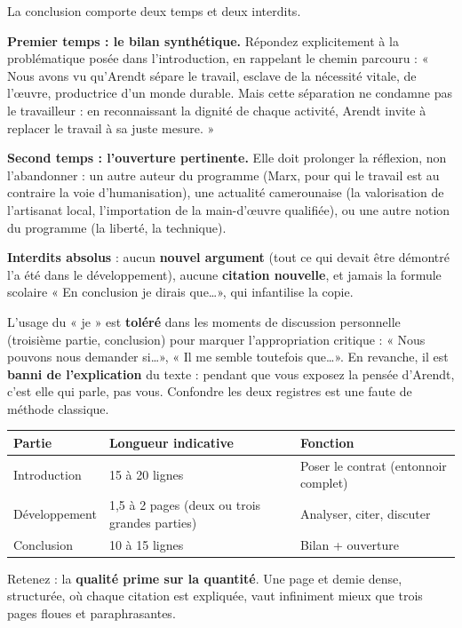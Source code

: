 \documentclass[11pt]{article}
\newcounter{popsec}
\newcounter{popsub}
\newcommand{\courssub}[1]{%
  \stepcounter{popsub}%
  \par\vspace{9pt}\noindent{\popxbold\fontsize{11.5}{13}\selectfont\color{popink}{\color{poporange}\thepopsec.\thepopsub}\hspace{6pt}#1}\par\nopagebreak\vspace{4pt}
}
\begin{document}
\courssub{La conclusion : boucler sans trahir}

La conclusion comporte deux temps et deux interdits.

\textbf{Premier temps : le bilan synthétique.} Répondez explicitement à la problématique posée dans l'introduction, en rappelant le chemin parcouru : « Nous avons vu qu'Arendt sépare le travail, esclave de la nécessité vitale, de l'\oe uvre, productrice d'un monde durable. Mais cette séparation ne condamne pas le travailleur : en reconnaissant la dignité de chaque activité, Arendt invite à replacer le travail à sa juste mesure. »

\textbf{Second temps : l'ouverture pertinente.} Elle doit prolonger la réflexion, non l'abandonner : un autre auteur du programme (Marx, pour qui le travail est au contraire la voie d'humanisation), une actualité camerounaise (la valorisation de l'artisanat local, l'importation de la main-d'\oe uvre qualifiée), ou une autre notion du programme (la liberté, la technique).

\textbf{Interdits absolus} : aucun \textbf{nouvel argument} (tout ce qui devait être démontré l'a été dans le développement), aucune \textbf{citation nouvelle}, et jamais la formule scolaire « En conclusion je dirais que\ldots », qui infantilise la copie.

\begin{savaistu}
L'usage du « je » est \textbf{toléré} dans les moments de discussion personnelle (troisième partie, conclusion) pour marquer l'appropriation critique : « Nous pouvons nous demander si\ldots », « Il me semble toutefois que\ldots ». En revanche, il est \textbf{banni de l'explication} du texte : pendant que vous exposez la pensée d'Arendt, c'est elle qui parle, pas vous. Confondre les deux registres est une faute de méthode classique.
\end{savaistu}

\begin{exemplebox}
\begin{center}
\begin{tabularx}{\linewidth}{|l|X|X|}\hline
\rowcolor{popblueL} \textbf{Partie} & \textbf{Longueur indicative} & \textbf{Fonction} \\ \hline
Introduction & 15 à 20 lignes & Poser le contrat (entonnoir complet) \\ \hline
Développement & 1,5 à 2 pages (deux ou trois grandes parties) & Analyser, citer, discuter \\ \hline
Conclusion & 10 à 15 lignes & Bilan + ouverture \\ \hline
\end{tabularx}
\end{center}
Retenez : la \textbf{qualité prime sur la quantité}. Une page et demie dense, structurée, où chaque citation est expliquée, vaut infiniment mieux que trois pages floues et paraphrasantes.
\end{exemplebox}
\end{document}
